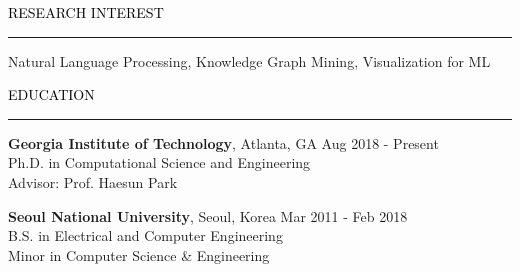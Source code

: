 \documentclass{resume} %
\renewenvironment{rSection}[1]{
	\sectionskip
	\textcolor{Black}{\MakeUppercase{#1}}
	\sectionlineskip
	\hrule
	\begin{list}{}{
			\setlength{\leftmargin}{1.5em}
		}
		\item[]
	}{
	\end{list}
}
\begin{document}
	
	\begin{rSection}{Research Interest}
		Natural Language Processing, Knowledge Graph Mining, Visualization for ML\hfill
		\vspace{-2mm}
	\end{rSection}
	
	
	\vspace*{-2.0mm}
	\begin{rSection}{Education}
		\vspace{-1mm}		
		{\bf Georgia Institute of Technology}, Atlanta, GA \hfill { Aug 2018 - Present} 
		\\ Ph.D. in Computational Science and Engineering  
		\\ Advisor: Prof. Haesun Park\hfill
		
		\vspace*{-2.5mm}
		{\bf Seoul National University}, Seoul, Korea \hfill { Mar 2011 - Feb 2018} 
		\\ B.S. in Electrical and Computer Engineering \hfill
		\\ Minor in Computer Science \& Engineering \hfill
				
	\end{rSection}
\vspace*{-2.5mm}


\end{document}
